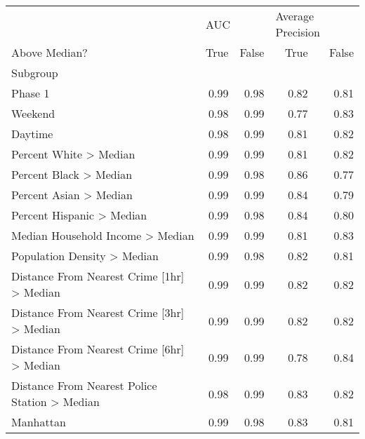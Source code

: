 \begin{tabular}{lrrrr}
\toprule
{} & \multicolumn{2}{l}{AUC} & \multicolumn{2}{l}{Average Precision} \\
Above Median? & True  & False &             True  & False \\
Subgroup                                      &       &       &                   &       \\
\midrule
Phase 1                                       &  0.99 &  0.98 &              0.82 &  0.81 \\
Weekend                                       &  0.98 &  0.99 &              0.77 &  0.83 \\
Daytime                                       &  0.98 &  0.99 &              0.81 &  0.82 \\
Percent White > Median                        &  0.99 &  0.99 &              0.81 &  0.82 \\
Percent Black > Median                        &  0.99 &  0.98 &              0.86 &  0.77 \\
Percent Asian > Median                        &  0.99 &  0.99 &              0.84 &  0.79 \\
Percent Hispanic > Median                     &  0.99 &  0.98 &              0.84 &  0.80 \\
Median Household Income > Median              &  0.99 &  0.99 &              0.81 &  0.83 \\
Population Density > Median                   &  0.99 &  0.98 &              0.82 &  0.81 \\
Distance From Nearest Crime [1hr] > Median    &  0.99 &  0.99 &              0.82 &  0.82 \\
Distance From Nearest Crime [3hr] > Median    &  0.99 &  0.99 &              0.82 &  0.82 \\
Distance From Nearest Crime [6hr] > Median    &  0.99 &  0.99 &              0.78 &  0.84 \\
Distance From Nearest Police Station > Median &  0.98 &  0.99 &              0.83 &  0.82 \\
Manhattan                                     &  0.99 &  0.98 &              0.83 &  0.81 \\
\bottomrule
\end{tabular}
